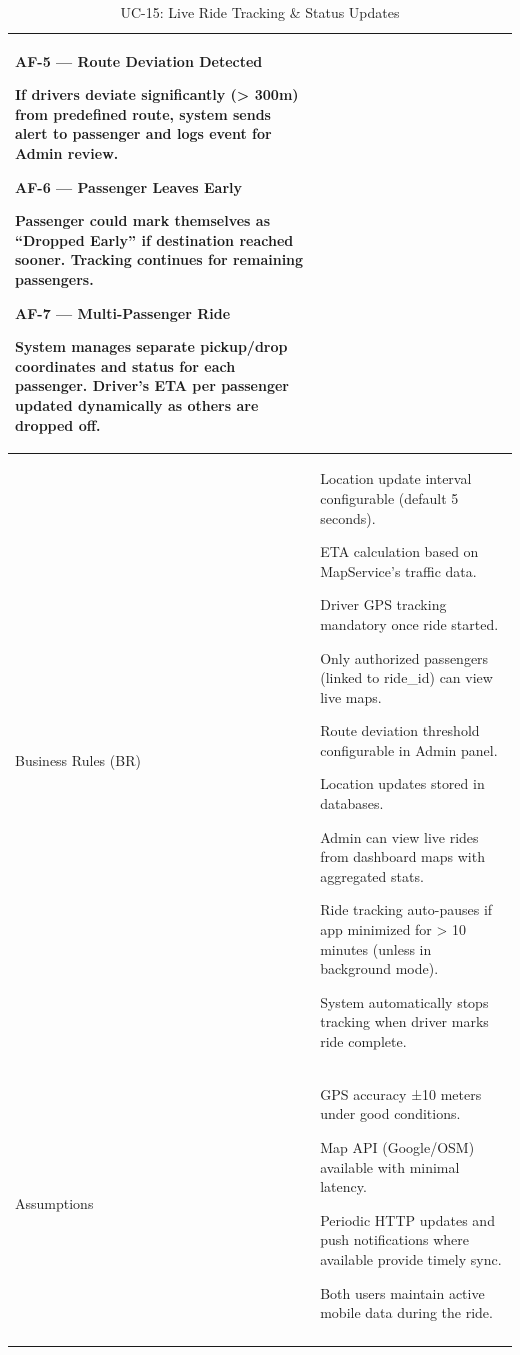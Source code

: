 \begin{longtable}{|p{3.5cm}|p{12cm}|}
\textbf{AF-5 --- Route Deviation Detected}

If drivers deviate significantly (> 300m) from predefined route, system sends alert to passenger and logs event for Admin review.

\textbf{AF-6 --- Passenger Leaves Early}

Passenger could mark themselves as “Dropped Early” if destination reached sooner. Tracking continues for remaining passengers.

\textbf{AF-7 --- Multi-Passenger Ride}

System manages separate pickup/drop coordinates and status for each passenger. Driver’s ETA per passenger updated dynamically as others are dropped off. \\
\hline
Business Rules (BR) &
Location update interval configurable (default 5 seconds).

ETA calculation based on MapService’s traffic data.

Driver GPS tracking mandatory once ride started.

Only authorized passengers (linked to ride\_id) can view live maps.

Route deviation threshold configurable in Admin panel.

Location updates stored in databases.

Admin can view live rides from dashboard maps with aggregated stats.

Ride tracking auto-pauses if app minimized for > 10 minutes (unless in background mode).

System automatically stops tracking when driver marks ride complete. \\
\hline
Assumptions &
GPS accuracy ±10 meters under good conditions.

Map API (Google/OSM) available with minimal latency.

Periodic HTTP updates and push notifications where available provide timely sync.

Both users maintain active mobile data during the ride. \\
\hline
\caption{UC-15: Live Ride Tracking \& Status Updates}
\end{longtable}

